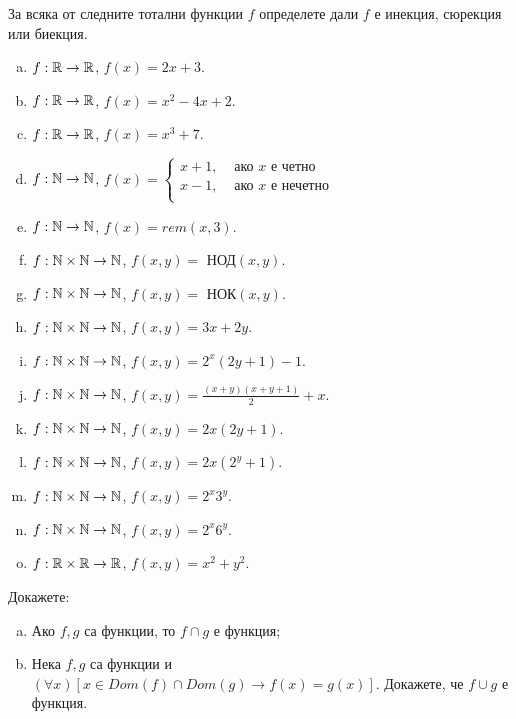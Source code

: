 \begin{problem}
  За всяка от следните тотални функции $f$ определете дали $f$ е
  инекция, сюрекция или биекция.
  \begin{enumerate}[a)]
  \item
    $f: \mathbb{R}\rightarrow \mathbb{R}$, $f(x) = 2x+3$.
  \item
    $f: \mathbb{R}\rightarrow \mathbb{R}$, $f(x) = x^2 - 4x +2$.
  \item 
    $f: \mathbb{R}\rightarrow \mathbb{R}$, $f(x) = x^3+7$.    
  \item
    $f: \mathbb{N}\rightarrow \mathbb{N}$, 
    $f(x) = 
      \begin{cases}
        x+1, & \mbox{ ако }x\mbox{ е четно}\\
        x-1, & \mbox{ ако }x\mbox{ е нечетно}\\
      \end{cases}$
    \item
    $f: \mathbb{N}\rightarrow \mathbb{N}$, $f(x) = rem(x,3)$.
  \item 
    $f: \mathbb{N}\times\mathbb{N} \rightarrow \mathbb{N}$,
    $f(x, y) = \mbox{ НОД}(x,y)$.
  \item 
    $f: \mathbb{N}\times\mathbb{N} \rightarrow \mathbb{N}$,
    $f(x, y) = \mbox{ НОК}(x,y)$.
  \item 
    $f: \mathbb{N} \times \mathbb{N}\rightarrow \mathbb{N}$,
    $f(x, y) = 3x+2y$.
  \item 
    $f: \mathbb{N} \times \mathbb{N}\rightarrow \mathbb{N}$,
    $f(x, y) = 2^x(2y+1)-1$.
  \item 
    $f: \mathbb{N} \times \mathbb{N}\rightarrow \mathbb{N}$,
    $f(x, y) = \frac{(x+y)(x+y+1)}{2} + x$.
  \item 
    $f: \mathbb{N} \times \mathbb{N}\rightarrow \mathbb{N}$,
    $f(x, y) = 2x(2y+1)$.
  \item
    $f: \mathbb{N} \times \mathbb{N}\rightarrow \mathbb{N}$,
    $f(x, y) = 2x(2^y+1)$.
  \item
    $f: \mathbb{N} \times \mathbb{N}\rightarrow \mathbb{N}$,
    $f(x, y) = 2^x3^y$.
  \item
    $f: \mathbb{N} \times \mathbb{N}\rightarrow \mathbb{N}$,
    $f(x, y) = 2^x6^y$.
  \item 
    $f: \mathbb{R}\times\mathbb{R}\rightarrow \mathbb{R}$,
    $f(x, y) = x^2+y^2$.
  \end{enumerate}
\end{problem}

\begin{problem}
  Докажете:
  \begin{enumerate}[a)]
  \item
    Ако $f,g$ са функции, то $f\cap g$ е функция;
  \item
    Нека $f,g$ са функции и $(\forall x)[x\in Dom(f)\cap Dom(g)\rightarrow f(x) = g(x)]$.
    Докажете, че $f\cup g$ е функция.
  \end{enumerate}
\end{problem}

